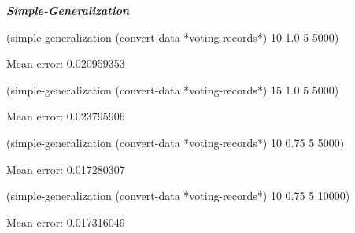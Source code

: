 \documentclass{article}
\begin{document}
\begin{flushleft}
\textbf{\emph{Simple-Generalization}  \\}
\end{flushleft}

 \begin{small}
(simple-generalization (convert-data *voting-records*) 10 1.0 5 5000)\\
  \end{small}
  \begin{normalsize}
  
\begin{flushleft}
  Mean error: 0.020959353 \\
\end{flushleft}
  
  \end{normalsize}


\begin{small}
(simple-generalization (convert-data *voting-records*) 15 1.0 5 5000)\\
  \end{small}
  \begin{normalsize}
  
\begin{flushleft}
  Mean error: 0.023795906 \\
\end{flushleft}
  
  \end{normalsize}
  
  \begin{small}
(simple-generalization (convert-data *voting-records*) 10 0.75 5 5000)\\
  \end{small}
  \begin{normalsize}
  
\begin{flushleft}
  Mean error: 0.017280307 \\
\end{flushleft}
  
  \end{normalsize}
  
  \begin{small}
(simple-generalization (convert-data *voting-records*) 10 0.75 5 10000)\\
  \end{small}
  \begin{normalsize}
  
\begin{flushleft}
  Mean error: 0.017316049 
\end{flushleft}
  
  \end{normalsize}
 
\end{document}
